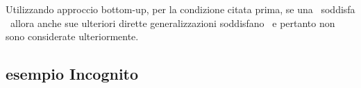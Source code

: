\noindent Utilizzando approccio bottom-up, per la condizione citata prima, se una \gen\ soddisfa \kanon\ allora anche sue ulteriori dirette generalizzazioni soddisfano \kanon\ e pertanto non sono considerate ulteriormente.



\subsection{esempio Incognito}




